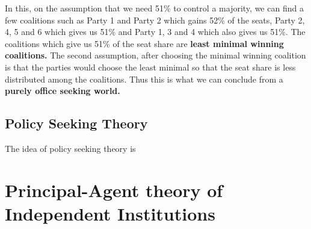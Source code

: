 \documentclass[12pt, letterpaper]{article}
\begin{document}
In this, on the assumption that we need 51\% to control a majority, we can find a few coalitions such as Party 1 and Party 2 which gains 52\% of the seats, Party 2, 4, 5 and 6 which gives us 51\% and Party 1, 3 and 4 which also gives us 51\%. The coalitions which give us 51\% of the seat share are \textbf{least minimal winning coalitions.} The second assumption, after choosing the minimal winning coalition is that the parties would choose the least minimal so that the seat share is less distributed among the coalitions. Thus this is what we can conclude from a \textbf{purely office seeking world.}

\subsection{Policy Seeking Theory}
The idea of policy seeking theory is 

\newpage
\section{Principal-Agent theory of Independent Institutions}
\end{document}
